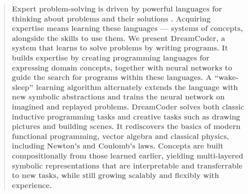 \documentclass[12pt]{article}
\newenvironment{sciabstract}{%
  \begin{quote} \bf}
{\end{quote}}
\begin{document}
  
  


\begin{sciabstract}
Expert problem-solving is driven by powerful languages for thinking about problems and their solutions%
. Acquiring expertise means learning these languages --- systems of concepts, alongside the skills to use them. We present DreamCoder, a system that learns to solve problems by writing programs. It builds expertise by creating programming languages for expressing domain concepts,
together with neural networks to guide the search for programs within these languages. A ``wake-sleep'' learning algorithm %
alternately extends the language with new symbolic abstractions and %
trains the neural network on imagined and replayed problems. DreamCoder solves both classic inductive programming tasks and creative tasks such as drawing pictures and building scenes. It rediscovers the basics of modern functional programming, vector algebra and classical physics, including Newton's and Coulomb's laws. 
Concepts are built compositionally from %
those learned earlier, yielding multi-layered symbolic representations that are interpretable and transferrable to new tasks, while still growing scalably and flexibly with experience.
%

\end{sciabstract}
\end{document}
